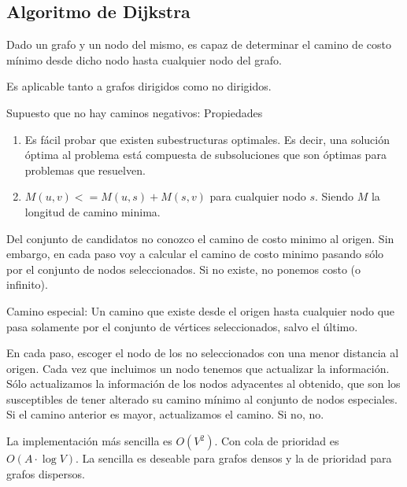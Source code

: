\subsection{Algoritmo de Dijkstra}
Dado un grafo y un nodo del mismo, es capaz de determinar el camino de costo mínimo desde dicho nodo hasta cualquier nodo del grafo.

Es aplicable tanto a grafos dirigidos como no dirigidos.

Supuesto que no hay caminos negativos:
Propiedades
\begin{enumerate}
    \item Es fácil probar que existen subestructuras optimales. Es decir, una solución óptima al problema está compuesta de subsoluciones que son óptimas para problemas que resuelven.
    \item $M(u,v) <= M(u,s) + M(s,v)$ para cualquier nodo $s$. Siendo $M$ la longitud de camino minima.
\end{enumerate}

Del conjunto de candidatos no conozco el camino de costo minimo al origen. Sin embargo, en cada paso voy a calcular el camino de costo minimo pasando sólo por el conjunto de nodos seleccionados. Si no existe, no ponemos costo (o infinito).


Camino especial: Un camino que existe desde el origen hasta cualquier nodo que pasa solamente por el conjunto de vértices seleccionados, salvo el último.

En cada paso, escoger el nodo de los no seleccionados con una menor distancia al origen.
Cada vez que incluimos un nodo tenemos que actualizar la información. Sólo actualizamos la información de los nodos adyacentes al obtenido, que son los susceptibles de tener alterado su camino mínimo al conjunto de nodos especiales.
Si el camino anterior es mayor, actualizamos el camino. Si no, no.

La implementación más sencilla es $O(V^2)$. Con cola de prioridad es $O(A\cdot \log V)$.
La sencilla es deseable para grafos densos y la de prioridad para grafos dispersos.

